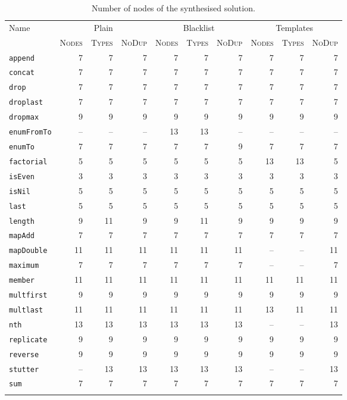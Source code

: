{\footnotesize
\begin{longtable}{@{}lr@{\hspace{2pt}}r@{\hspace{2pt}}rr@{\hspace{2pt}}r@{\hspace{2pt}}rr@{\hspace{2pt}}r@{\hspace{2pt}}r@{}}
Name & \multicolumn{3}{c}{\textsf{Plain}} & \multicolumn{3}{c}{\textsf{Blacklist}} & \multicolumn{3}{c}{\textsf{Templates}} \\
\cmidrule(lr){2-4} \cmidrule(lr){5-7} \cmidrule(l){8-10}
     & \textsc{Nodes} & \textsc{Types} & \textsc{NoDup} & \textsc{Nodes} & \textsc{Types} & \textsc{NoDup} & \textsc{Nodes} & \textsc{Types} & \textsc{NoDup} \\
\midrule
\verb|append| & 7 & 7 & 7 & 7 & 7 & 7 & 7 & 7 & 7 \\
\verb|concat| & 7 & 7 & 7 & 7 & 7 & 7 & 7 & 7 & 7 \\
\verb|drop| & 7 & 7 & 7 & 7 & 7 & 7 & 7 & 7 & 7 \\
\verb|droplast| & 7 & 7 & 7 & 7 & 7 & 7 & 7 & 7 & 7 \\
\verb|dropmax| & 9 & 9 & 9 & 9 & 9 & 9 & 9 & 9 & 9 \\
\verb|enumFromTo| & -- & -- & -- & 13 & 13 & -- & -- & -- & -- \\
\verb|enumTo| & 7 & 7 & 7 & 7 & 7 & 9 & 7 & 7 & 7 \\
\verb|factorial| & 5 & 5 & 5 & 5 & 5 & 5 & 13 & 13 & 5 \\
\verb|isEven| & 3 & 3 & 3 & 3 & 3 & 3 & 3 & 3 & 3 \\
\verb|isNil| & 5 & 5 & 5 & 5 & 5 & 5 & 5 & 5 & 5 \\
\verb|last| & 5 & 5 & 5 & 5 & 5 & 5 & 5 & 5 & 5 \\
\verb|length| & 9 & 11 & 9 & 9 & 11 & 9 & 9 & 9 & 9 \\
\verb|mapAdd| & 7 & 7 & 7 & 7 & 7 & 7 & 7 & 7 & 7 \\
\verb|mapDouble| & 11 & 11 & 11 & 11 & 11 & 11 & -- & -- & 11 \\
\verb|maximum| & 7 & 7 & 7 & 7 & 7 & 7 & -- & -- & 7 \\
\verb|member| & 11 & 11 & 11 & 11 & 11 & 11 & 11 & 11 & 11 \\
\verb|multfirst| & 9 & 9 & 9 & 9 & 9 & 9 & 9 & 9 & 9 \\
\verb|multlast| & 11 & 11 & 11 & 11 & 11 & 11 & 13 & 11 & 11 \\
\verb|nth| & 13 & 13 & 13 & 13 & 13 & 13 & -- & -- & 13 \\
\verb|replicate| & 9 & 9 & 9 & 9 & 9 & 9 & 9 & 9 & 9 \\
\verb|reverse| & 9 & 9 & 9 & 9 & 9 & 9 & 9 & 9 & 9 \\
\verb|stutter| & -- & 13 & 13 & 13 & 13 & 13 & -- & -- & 13 \\
\verb|sum| & 7 & 7 & 7 & 7 & 7 & 7 & 7 & 7 & 7 \\
\bottomrule
\caption{Number of nodes of the synthesised solution.\label{fig:nofnodestable}}
\end{longtable}}

